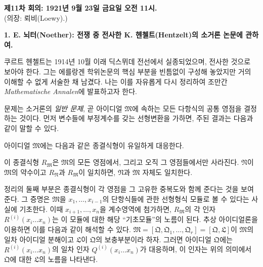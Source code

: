 
\begin{center}
\textbf{제11차 회의: 1921년 9월 23일 금요일 오전 11시.}\\
(의장: 뢰비(Loewy).)
\end{center}

\begin{center}
\textbf{1. E. 뇌터(Noether): 전쟁 중 전사한 K. 헨첼트(Hentzelt)의 소거론 논문에 관하여.}
\end{center}

쿠르트 헨첼트는 1914년 10월 이래 딕스뮈데 전선에서 실종되었으며, 전사한 것으로 보아야 한다. 그는 에를랑겐 학위논문의 핵심 부분을 빈틈없이 구성해 놓았지만 거의 이해할 수 없게 서술한 채 남겼다. 나는 이를 자유롭게 다시 정리하여 조만간 \emph{Mathematische Annalen}에 발표하고자 한다.

문제는 소거론의 \emph{일반 문제}, 곧 아이디얼 $\mathfrak M$에 속하는 모든 다항식의 공통 영점을 결정하는 것이다. 먼저 변수들에 부정계수를 갖는 선형변환을 가하면, 주된 결과는 다음과 같이 말할 수 있다.

아이디얼 $\mathfrak M$에는 다음과 같은 종결식형이 유일하게 대응한다.
\par\smallskip
\noindent{}
\par\smallskip\noindent
이 종결식형 $R_{\mathfrak M}$은 $\mathfrak M$의 모든 영점에서, 그리고 오직 그 영점들에서만 사라진다. $\mathfrak N$이 $\mathfrak M$의 약수이고 $R_{\mathfrak N}$과 $R_{\mathfrak M}$이 일치하면, $\mathfrak N$과 $\mathfrak M$ 자체도 일치한다.

정리의 둘째 부분은 종결식형이 각 영점을 그 고유한 중복도와 함께 준다는 것을 보여 준다. 그 증명은 $\mathfrak M$을 $x_1,\ldots,x_{i-1}$의 단항식들에 관한 선형형식 모듈로 볼 수 있다는 사실에 기초한다. 이때 $x_{i+1},\ldots,x_n$을 계수영역에 첨가하면, $R_{\mathfrak M}$의 각 인자 $R^{(i)}(x_i\ldots x_n)$는 이 모듈에 대한 해당 ``기초모듈''의 노름이 된다. 추상 아이디얼론을 이용하면 이를 다음과 같이 해석할 수 있다. $\mathfrak M=[\mathfrak Q,\mathfrak Q_1,\ldots,\mathfrak Q_r]=[\mathfrak Q,\mathfrak L]$이 $\mathfrak M$의 일차 아이디얼 분해이고 $\mathfrak L$이 $\mathfrak Q$의 보충부분이라 하자. 그러면 아이디얼 $\mathfrak Q$에는 $R^{(i)}(x_i\ldots x_n)$의 일차 인자 $Q^{(i)}(x_i\ldots x_n)$가 대응하며, 이 인자는 위의 의미에서 $\mathfrak Q$에 대한 $\mathfrak L$의 노름을 나타낸다.
